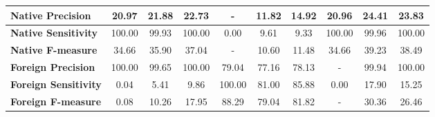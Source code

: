 \begin{table}[htp]
{\begin{tabular}{l|c|c|c|c|c|c|c|c|c|}
		\multicolumn{1}{|l|}{\textbf{Native Precision}}          & 20.97                             & 21.88                             & 22.73                            & -                                 & 11.82                             & 14.92                            & 20.96                             & 24.41                             & 23.83                            \\ \hline
		\multicolumn{1}{|l|}{\textbf{Native Sensitivity}}        & 100.00                            & 99.93                             & 100.00                           & 0.00                              & 9.61                              & 9.33                             & 100.00                            & 99.96                             & 100.00                           \\ \hline
		\multicolumn{1}{|l|}{\textbf{Native F-measure}}          & 34.66                             & 35.90                             & 37.04                            & -                                 & 10.60                             & 11.48                            & 34.66                             & 39.23                             & 38.49                            \\ \hline
		\multicolumn{1}{|l|}{\textbf{Foreign Precision}}         & 100.00                            & 99.65                             & 100.00                           & 79.04                             & 77.16                             & 78.13                            & -                                 & 99.94                             & 100.00                           \\ \hline
		\multicolumn{1}{|l|}{\textbf{Foreign Sensitivity}}       & 0.04                              & 5.41                              & 9.86                             & 100.00                            & 81.00                             & 85.88                            & 0.00                              & 17.90                             & 15.25                            \\ \hline
		\multicolumn{1}{|l|}{\textbf{Foreign F-measure}}         & 0.08                              & 10.26                             & 17.95                            & 88.29                             & 79.04                             & 81.82                            & -                                 & 30.36                             & 26.46                            \\ \hline
	\end{tabular}
}
\end{table}

